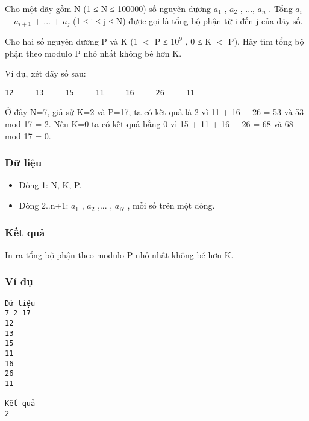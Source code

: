 



   Cho một dãy gồm N (1 ≤ N ≤ 100000) số nguyên dương $a_{1}$   , $a_{2}$   , ..., $a_{n}$   . Tổng $a_{i}$   + $a_{i+1}$   + ... + $a_{j}$   (1 ≤ i ≤ j ≤ N) được gọi là tổng bộ phận từ i đến j của dãy số.  

   Cho hai số nguyên dương P và K (1 $<$ P ≤ $10^{9}$   , 0 ≤ K $<$ P). Hãy tìm tổng bộ phận theo modulo P nhỏ nhất không bé hơn K.  

   Ví dụ, xét dãy số sau:  
\begin{verbatim}
12     13     15     11     16     26     11
\end{verbatim}

   Ở đây N=7, giả sử K=2 và P=17, ta có kết quả là 2 vì 11 + 16 + 26 = 53 và 53 mod 17 = 2. Nếu K=0 ta có kết quả bằng 0 vì 15 + 11 + 16 + 26 = 68 và 68 mod 17 = 0.  

\subsubsection{   Dữ liệu  }
\begin{itemize}
	\item     Dòng 1: N, K, P.   
	\item     Dòng 2..n+1: $a_{1}$    , $a_{2}$    ,... , $a_{N}$    , mỗi số trên một dòng.   
\end{itemize}

\subsubsection{   Kết quả  }

   In ra tổng bộ phận theo modulo P nhỏ nhất không bé hơn K.  

\subsubsection{   Ví dụ  }
\begin{verbatim}
Dữ liệu
7 2 17
12
13
15
11
16
26
11

Kết quả
2
\end{verbatim}
